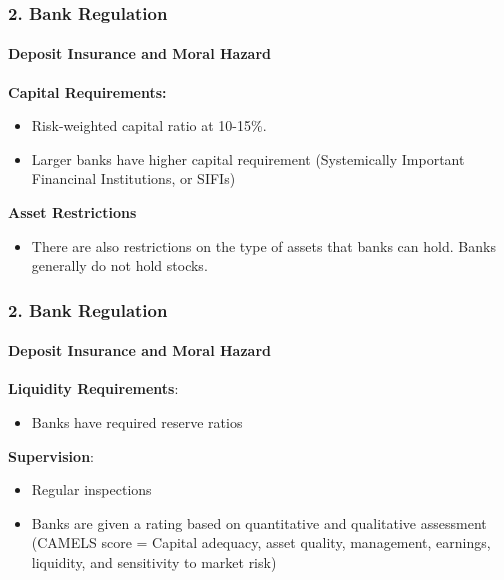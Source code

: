 \documentclass{beamer}
\begin{document}
\begin{frame}[t]
\frametitle{2. Bank Regulation}
\framesubtitle{Deposit Insurance and Moral Hazard}

    \textbf{Capital Requirements:}
    
    \begin{itemize}
        \item Risk-weighted capital ratio at 10-15\%.
        \item Larger banks have higher capital requirement (Systemically Important Financinal Institutions, or SIFIs)
    \end{itemize}
    \vspace{1em}
    
\textbf{Asset Restrictions}
    \begin{itemize}
        \item There are also restrictions on the type of assets that banks can hold.   Banks generally do not hold stocks.
    \end{itemize}

\end{frame}


\begin{frame}[t]
\frametitle{2. Bank Regulation}
\framesubtitle{Deposit Insurance and Moral Hazard}

     \textbf{Liquidity Requirements}:
    
    \begin{itemize}
        \item Banks have required reserve ratios
    \end{itemize}
    \vspace{1em}

    \textbf{Supervision}:
    \begin{itemize}
        \item Regular inspections
        \item Banks are given a rating based on quantitative and qualitative assessment (CAMELS score = Capital adequacy, asset quality, management, earnings, liquidity, and sensitivity to market risk)
    \end{itemize}

\end{frame}
\end{document}
